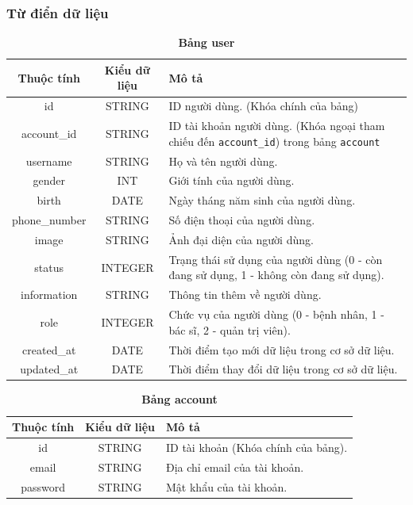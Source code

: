 \subsubsection{Từ điển dữ liệu}

\begin{table}[H]
  \caption{\bfseries \fontsize{12pt}{0pt}\selectfont Bảng user}
  \centering
  \begin{tabularx}{0.9\textwidth}{|c|c|X|}
    \hline
    \textbf{Thuộc tính} & \textbf{Kiểu dữ liệu} & \textbf{Mô tả} \\
    \hline
    id & STRING & ID người dùng. (Khóa chính của bảng) \\
    \hline
    account\_id & STRING & ID tài khoản người dùng. (Khóa ngoại tham chiếu đến \texttt{account\_id}) trong bảng \texttt{account}\\
    \hline
    username & STRING & Họ và tên người dùng. \\
    \hline
    gender & INT & Giới tính của người dùng. \\
    \hline
    birth & DATE & Ngày tháng năm sinh của người dùng. \\
    \hline
    phone\_number & STRING & Số điện thoại của người dùng. \\
    \hline
    image & STRING & Ảnh đại diện của người dùng. \\
    \hline
    status & INTEGER & Trạng thái sử dụng của người dùng (0 - còn đang sử dụng, 1 - không còn đang sử dụng). \\
    \hline
    information & STRING & Thông tin thêm về người dùng. \\
    \hline
    role & INTEGER & Chức vụ của người dùng (0 - bệnh nhân, 1 - bác sĩ, 2 - quản trị viên). \\
    \hline
    created\_at & DATE & Thời điểm tạo mới dữ liệu trong cơ sở dữ liệu. \\
    \hline
    updated\_at & DATE & Thời điểm thay đổi dữ liệu trong cơ sở dữ liệu. \\
    \hline
    
  \end{tabularx}
\end{table}


\begin{table}[H]
  \caption{\bfseries \fontsize{12pt}{0pt}\selectfont Bảng account}
  \centering
  \begin{tabularx}{0.9\textwidth}{|c|c|X|}
    \hline
    \textbf{Thuộc tính} & \textbf{Kiểu dữ liệu} & \textbf{Mô tả} \\
    \hline
    id & STRING & ID tài khoản (Khóa chính của bảng). \\
    \hline
    email & STRING & Địa chỉ email của tài khoản. \\
    \hline
    password & STRING & Mật khẩu của tài khoản. \\
    \hline
  \end{tabularx}
\end{table}

